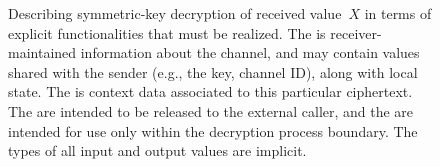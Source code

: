 \begin{figure}
\centering
{} 
%

\caption{Describing symmetric-key decryption of received value~$X$ in terms of explicit
  functionalities that must be realized. The  is
  receiver-maintained information about the channel, and may contain values shared with the sender
  (e.g., the key, channel ID), along with local state.  The
   is context data associated to this particular
  ciphertext. The  are intended to be released
  to the external caller, and the  are intended
  for use only within the decryption process boundary.  
  The types of all input and output values are implicit.}
\label{fig:syntax-api-example}
\end{figure}

